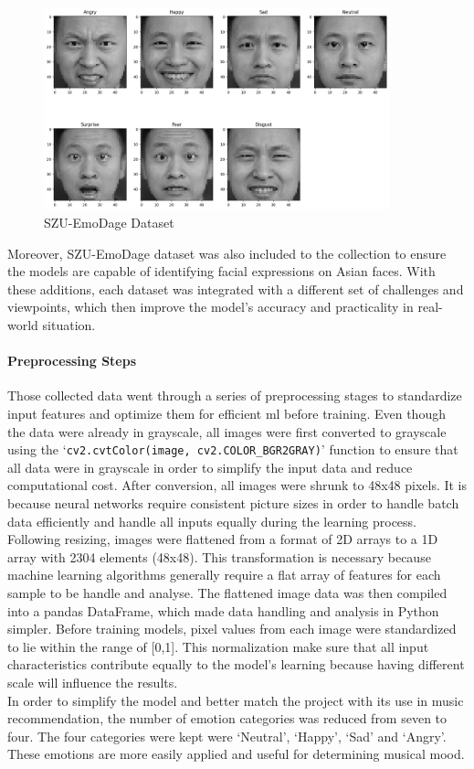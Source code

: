 \begin{figure}[H]
    \centering
    \includegraphics[width=10cm]{Images/szuemodage.png}
    \caption{SZU-EmoDage Dataset}
    \label{fig:szu-emodage}
\end{figure}
\indent Moreover, SZU-EmoDage \citep{who_2022_a} dataset was also included to the collection to ensure the models are capable of identifying facial expressions on Asian faces.
With these additions, each dataset was integrated with a different set of challenges and viewpoints, which then improve the model's accuracy and practicality in real-world situation.
\paragraph{Preprocessing Steps}
Those collected data went through a series of preprocessing stages to standardize input features and optimize them for efficient \gls{ml} before training.
Even though the data were already in grayscale, all images were first converted to grayscale using the `\texttt{cv2.cvtColor(image, cv2.COLOR\_BGR2GRAY)}' function to ensure that all data were in grayscale in order to simplify the input data and reduce computational cost.
After conversion, all images were shrunk to 48x48 pixels.
It is because neural networks require consistent picture sizes in order to handle batch data efficiently and handle all inputs equally during the learning process.
\\
\indent Following resizing, images were flattened from a format of 2D arrays to a 1D array with 2304 elements (48x48). 
This transformation is necessary because machine learning algorithms generally require a flat array of features for each sample to be handle and analyse.
The flattened image data was then compiled into a pandas DataFrame, which made data handling and analysis in Python simpler.
Before training models, pixel values from each image were standardized to lie within the range of [0,1]. 
This normalization make sure that all input characteristics contribute equally to the model's learning because having different scale will influence the results.
\\
\indent In order to simplify the model and better match the project with its use in music recommendation, the number of emotion categories was reduced from seven to four.
The four categories were kept were `Neutral', `Happy', `Sad' and `Angry'.
These emotions are more easily applied and useful for determining musical mood.
